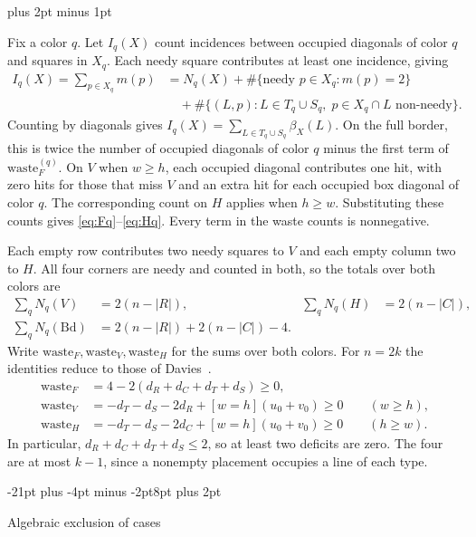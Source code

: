 \documentclass[11pt,a4paper]{article}
\makeatletter
\renewcommand{\section}{\@startsection{section}{1}{\z@}%
  {-21pt plus -4pt minus -2pt}{8pt plus 2pt}%
  {\normalfont\fontsize{14}{17}\selectfont\bfseries\raggedright}}
\renewenvironment{proof}[1][\proofname]{%
  \par\pushQED{\qed}\normalfont
  \topsep8pt plus 2pt minus 1pt\relax
  \trivlist\item[\hskip\labelsep\itshape #1\@addpunct{.}]\ignorespaces
}{\popQED\endtrivlist\@endpefalse}
\theoremstyle{result}
\theoremstyle{definition}
\theoremstyle{remark}
\newcommand{\waste}{\mathrm{waste}}
\newcommand{\Bd}{\mathrm{Bd}}
\makeatother
\begin{document}
\begin{proof}
Fix a color $q$. Let $I_q(X)$ count incidences between occupied
diagonals of color $q$ and squares in $X_q$. Each needy square
contributes at least one incidence, giving
\[
  \begin{aligned}
    I_q(X) = \sum_{p \in X_q} m(p)
      &= N_q(X) + \#\{\text{needy } p \in X_q : m(p)=2\}\\
      &\quad + \#\{(L,p) : L \in T_q \cup S_q,\; p \in X_q \cap L \text{ non-needy}\}.
  \end{aligned}
\]
Counting by diagonals gives $I_q(X)=\sum_{L\in T_q\cup S_q}\beta_X(L)$.
On the full border, this is twice the number of occupied diagonals
of color $q$ minus the first term of $\waste_F^{(q)}$. On $V$ when
$w\ge h$, each occupied diagonal contributes one hit, with zero
hits for those that miss $V$ and an extra hit for each occupied box
diagonal of color $q$. The corresponding count on $H$ applies when
$h\ge w$. Substituting these counts gives \eqref{eq:Fq}--\eqref{eq:Hq}.
Every term in the waste counts is nonnegative.
\end{proof}

Each empty row contributes two needy squares to $V$ and each empty
column two to $H$. All four corners are needy and counted in both,
so the totals over both colors are
\begin{align*}
  \sum_q N_q(V) &= 2(n-|R|), & \sum_q N_q(H) &= 2(n-|C|),\\
  \sum_q N_q(\Bd) &= 2(n-|R|)+2(n-|C|)-4.
\end{align*}
Write $\waste_F,\waste_V,\waste_H$ for the sums over both colors.
For $n=2k$ the identities reduce to those of
Davies~\cite[Section~2]{Davies2026}.
\begin{align}
  \waste_F &= 4 - 2(d_R + d_C + d_T + d_S) \ge 0, \label{eq:Ftot} \\
  \waste_V &= -d_T - d_S - 2d_R + [w=h](u_0+v_0) \ge 0 \qquad (w \ge h), \label{eq:Vtot} \\
  \waste_H &= -d_T - d_S - 2d_C + [w=h](u_0+v_0) \ge 0 \qquad (h \ge w). \label{eq:Htot}
\end{align}
In particular, $d_R + d_C + d_T + d_S \le 2$, so at least two
deficits are zero. The four are at most $k-1$, since a nonempty
placement occupies a line of each type.

\section{Algebraic exclusion of cases}\label{sec:algebraic}
\end{document}

